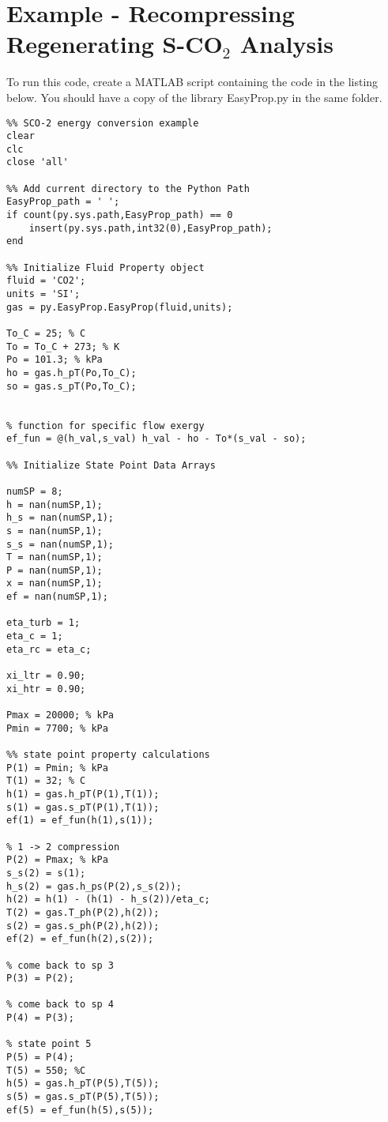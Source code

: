 \chapter{Example - Recompressing Regenerating S-CO$_{2}$ Analysis}
\label{app:rrsco2_ex}

To run this code, create a MATLAB script containing the code in the listing below.  You should have a copy of the library EasyProp.py in the same folder.

\begin{fullwidth}
\begin{lstlisting}
%% SCO-2 energy conversion example
clear
clc
close 'all'

%% Add current directory to the Python Path
EasyProp_path = ' '; 
if count(py.sys.path,EasyProp_path) == 0  
    insert(py.sys.path,int32(0),EasyProp_path); 
end

%% Initialize Fluid Property object
fluid = 'CO2';
units = 'SI';
gas = py.EasyProp.EasyProp(fluid,units);

To_C = 25; % C
To = To_C + 273; % K
Po = 101.3; % kPa
ho = gas.h_pT(Po,To_C);
so = gas.s_pT(Po,To_C);


% function for specific flow exergy
ef_fun = @(h_val,s_val) h_val - ho - To*(s_val - so);

%% Initialize State Point Data Arrays

numSP = 8;
h = nan(numSP,1);
h_s = nan(numSP,1);
s = nan(numSP,1);
s_s = nan(numSP,1);
T = nan(numSP,1);
P = nan(numSP,1);
x = nan(numSP,1);
ef = nan(numSP,1);

eta_turb = 1;
eta_c = 1;
eta_rc = eta_c;

xi_ltr = 0.90;
xi_htr = 0.90;

Pmax = 20000; % kPa
Pmin = 7700; % kPa

%% state point property calculations
P(1) = Pmin; % kPa
T(1) = 32; % C
h(1) = gas.h_pT(P(1),T(1));
s(1) = gas.s_pT(P(1),T(1));
ef(1) = ef_fun(h(1),s(1));

% 1 -> 2 compression
P(2) = Pmax; % kPa
s_s(2) = s(1);
h_s(2) = gas.h_ps(P(2),s_s(2));
h(2) = h(1) - (h(1) - h_s(2))/eta_c;
T(2) = gas.T_ph(P(2),h(2));
s(2) = gas.s_ph(P(2),h(2));
ef(2) = ef_fun(h(2),s(2));

% come back to sp 3
P(3) = P(2);

% come back to sp 4
P(4) = P(3);

% state point 5
P(5) = P(4);
T(5) = 550; %C
h(5) = gas.h_pT(P(5),T(5));
s(5) = gas.s_pT(P(5),T(5));
ef(5) = ef_fun(h(5),s(5));



\end{lstlisting}
\end{fullwidth}
